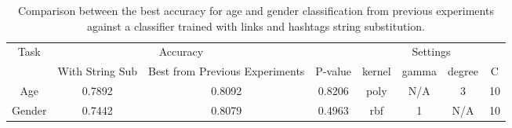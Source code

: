 \documentclass[a4paper]{llncs}
\begin{document}
\begin{table}[!htbp]
\centering
\begin{tabular}{|c|c|c|c|c|c|c|c|}
\hline
\multirow{2}{*}{Task} & \multicolumn{2}{c|}{Accuracy}                    &         & \multicolumn{4}{c|}{Settings} \\ \cline{2-8} 
                      & With String Sub & Best from Previous Experiments & P-value & kernel  & gamma & degree & C  \\ \hline
Age                   & 0.7892          & 0.8092                         & 0.8206  & poly    & N/A   & 3      & 10 \\ \hline
Gender                & 0.7442          & 0.8079                         & 0.4963  & rbf     & 1     & N/A    & 10 \\ \hline
\end{tabular}
\caption{Comparison between the best accuracy for age and gender classification from previous experiments against a classifier trained with links and hashtags string substitution.}
\label{table:StringSub}
\end{table}
\end{document}
